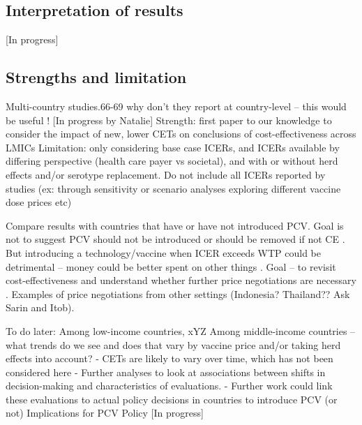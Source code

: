 \documentclass[12pt]{article}
\begin{document}
\subsection{Interpretation of results}
[In progress]

\subsection{Strengths and limitation}
Multi-country studies.66-69 why don't they report at country-level – this would be useful !
[In progress by Natalie]
Strength: first paper to our knowledge to consider the impact of new, lower CETs on conclusions of cost-effectiveness across LMICs
Limitation: only considering base case ICERs, and ICERs available by differing perspective (health care payer vs societal), and with or without herd effects and/or serotype replacement.
Do not include all ICERs reported by studies (ex: through sensitivity or scenario analyses exploring different vaccine dose prices etc)

Compare results with countries that have or have not introduced PCV. Goal is not to suggest PCV should not be introduced or should be removed if not CE . But introducing a technology/vaccine when ICER exceeds WTP could be detrimental – money could be better spent on other things .
Goal – to revisit cost-effectiveness and understand whether further price negotiations are necessary . Examples of price negotiations from other settings (Indonesia? Thailand?? Ask Sarin and Itob). 

To do later:
Among low-income countries, xYZ 
Among middle-income countries – what trends do we see and does that vary by vaccine price and/or taking herd effects into account?
-	CETs are likely to vary over time, which has not been considered here
-	Further analyses to look at associations between shifts in decision-making and characteristics of evaluations.
-	Further work could link these evaluations to actual policy decisions in countries to introduce PCV (or not)
Implications for PCV Policy
[In progress]



\clearpage
\printbibliography
\end{document}

